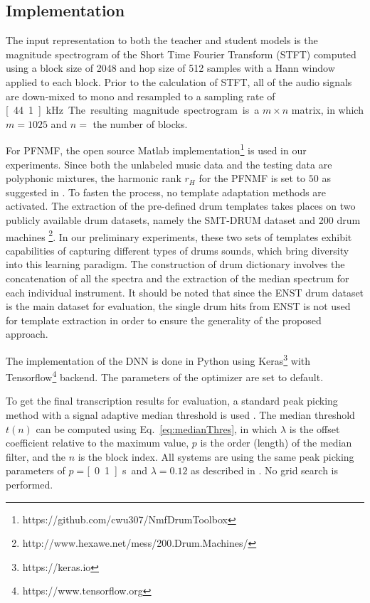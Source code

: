 \documentclass{article}
\begin{document}
\subsection{Implementation}
The input representation to both the teacher and student models is the magnitude spectrogram of the Short Time Fourier Transform (STFT) computed using a block size of 2048 and hop size of 512 samples with a Hann window applied to each block. Prior to the calculation of STFT, all of the audio signals are down-mixed to mono and resampled to a sampling rate of \unit[44.1]{kHz}. The resulting magnitude spectrogram is a $m \times n$ matrix, in which $m = 1025$ and $n = $ the number of blocks. 

For PFNMF, the open source Matlab implementation\footnote{https://github.com/cwu307/NmfDrumToolbox} is used in our experiments. Since both the unlabeled music data and the testing data are polyphonic mixtures, the harmonic rank $r_{H} $ for the PFNMF is set to $50$ as suggested in \cite{Wu2015a}. To fasten the process, no template adaptation methods are activated. The extraction of the pre-defined drum templates takes places on two publicly available drum datasets, namely the SMT-DRUM dataset \cite{Dittmar2014} and 200 drum machines \footnote{http://www.hexawe.net/mess/200.Drum.Machines/}. In our preliminary experiments, these two sets of templates exhibit capabilities of capturing different types of drums sounds, which bring diversity into this learning paradigm. The construction of drum dictionary involves the concatenation of all the spectra and the extraction of the median spectrum for each individual instrument. It should be noted that since the ENST drum dataset is the main dataset for evaluation, the single drum hits from ENST is not used for template extraction in order to ensure the generality of the proposed approach.

The implementation of the DNN is done in Python using Keras\footnote{https://keras.io} with Tensorflow\footnote{https://www.tensorflow.org} backend. The parameters of the optimizer are set to default. 

To get the final transcription results for evaluation, a standard peak picking method with a signal adaptive median threshold is used \cite{Lerch2012}. The median threshold $t(n)$ can be computed using Eq.~\ref{eq:medianThres}, in which $\lambda$ is the offset coefficient relative to the maximum value, $p$ is the order (length) of the median filter, and the $n$ is the block index. All systems are using the same peak picking parameters of $p = $\unit[0.1]{s} and $\lambda = 0.12$ as described in \cite{Wu2015a}. No grid search is performed.  
\end{document}
